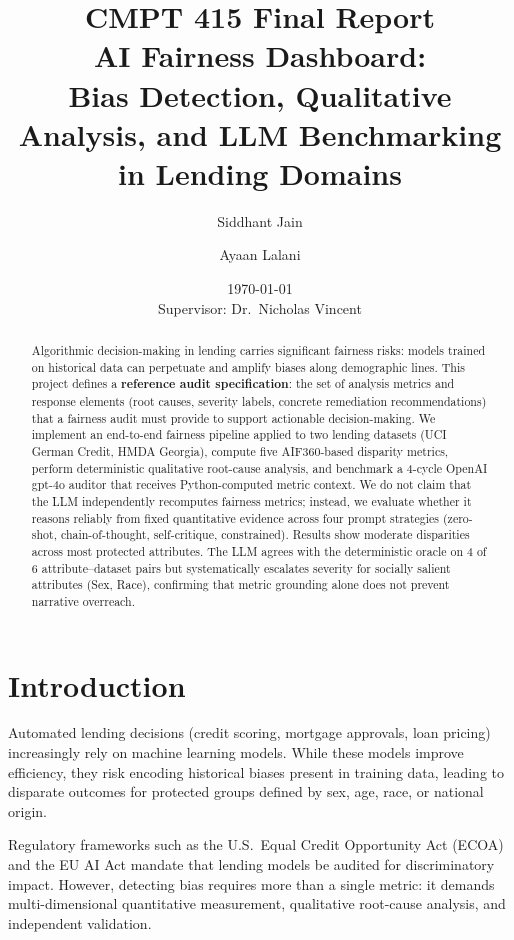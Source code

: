 \documentclass[11pt,a4paper]{article}
\title{%
  \textbf{CMPT 415 Final Report}\\[6pt]
  \Large AI Fairness Dashboard:\\[2pt]
  \large Bias Detection, Qualitative Analysis, and LLM Benchmarking\\
  in Lending Domains
}
\author{
  Siddhant Jain \and Ayaan Lalani
}
\date{\today\\[4pt]\small Supervisor: Dr.\ Nicholas Vincent}
\begin{document}
\maketitle

\begin{abstract}
Algorithmic decision-making in lending carries significant fairness risks:
models trained on historical data can perpetuate and amplify biases along
demographic lines. This project defines a \textbf{reference audit
specification}: the set of analysis metrics and response elements (root
causes, severity labels, concrete remediation recommendations) that a
fairness audit must provide to support actionable decision-making. We
implement an end-to-end fairness pipeline applied to two lending datasets
(UCI German Credit, HMDA Georgia), compute five AIF360-based disparity
metrics, perform deterministic qualitative root-cause analysis, and
benchmark a 4-cycle OpenAI gpt-4o auditor that receives Python-computed
metric context. We do not claim that the LLM independently recomputes
fairness metrics; instead, we evaluate whether it reasons reliably from
fixed quantitative evidence across four prompt strategies (zero-shot,
chain-of-thought, self-critique, constrained). Results show moderate
disparities across most protected attributes. The LLM agrees with the
deterministic oracle on 4 of 6 attribute--dataset pairs but systematically
escalates severity for socially salient attributes (Sex, Race), confirming
that metric grounding alone does not prevent narrative overreach.
\end{abstract}

\section{Introduction}

Automated lending decisions (credit scoring, mortgage approvals, loan
pricing) increasingly rely on machine learning models. While these models
improve efficiency, they risk encoding historical biases present in
training data, leading to disparate outcomes for protected groups defined
by sex, age, race, or national origin.

Regulatory frameworks such as the U.S.\ Equal Credit Opportunity Act (ECOA)
and the EU AI Act mandate that lending models be audited for discriminatory
impact. However, detecting bias requires more than a single metric: it
demands multi-dimensional quantitative measurement, qualitative root-cause
analysis, and independent validation.
\end{document}
